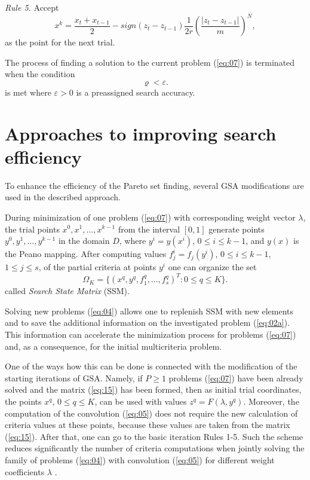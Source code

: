 \documentclass[runningheads]{llncs}
\begin{document}
\textit{Rule 5.} Accept
\begin{equation}
    \label{eq:13}
    x^{k} = \frac{x_t + x_{t-1}}{2} - sign(z_t - z_{t-1}) \frac{1}{2r} \left(\frac{|z_t - z_{t-1}|}{m} \right)^N,
\end{equation}
as the point for the next trial.

The process of finding a solution to the current problem (\ref{eq:07}) is terminated when the condition
\begin{equation}
    \label{eq:14}
    \varrho < \varepsilon.
\end{equation}
is met where $\varepsilon > 0$ is a preassigned search accuracy.



\section{Approaches to improving search efficiency}
\label{sec:4}

To enhance the efficiency of the Pareto set finding, several GSA modifications are used in the described approach.

During minimization of one problem (\ref{eq:07}) with corresponding weight vector $\lambda$, the trial points $x^0, x^1,\dots,x^{k-1}$ from the interval $[0,1]$ generate points $y^0, y^1,\dots,y^{k-1}$ in the domain $D$, where $y^i=y(x^i)$, $0 \leq i \leq k-1$, and $y(x)$ is the Peano mapping. After computing values $f^i_j=f_j(y^i)$, $0 \leq i \leq k-1$, $1 \leq j \leq s$, of the partial criteria at points $y^i$ one can organize the set 
\begin{equation}
    \label{eq:15}
    \Omega_K=\{(x^q,y^q,f^q_1,\dots,f^q_s)^T: 0 \leq q \leq K\}.
\end{equation}
called \textit{Search State Matrix} (SSM).

Solving new problems (\ref{eq:04}) allows one to replenish SSM with new elements and to save the additional information on the investigated problem (\ref{eq:02a}). This information can accelerate the minimization process for problems (\ref{eq:07}) and, as a consequence, for the initial multicriteria problem. 

One of the ways how this can be done is connected with the modification of the starting iterations of GSA. Namely, if $P \geq 1$ problems (\ref{eq:07}) have been already solved and the matrix (\ref{eq:15}) has been formed, then as initial trial coordinates, the points $x^q$, $0 \leq q \leq K$, can be used with values $z^q = F(\lambda,y^q)$. Moreover, the computation of the convolution (\ref{eq:05}) does not require the new calculation of criteria values at these points, because these values are taken from the matrix (\ref{eq:15}). After that, one can go to the basic iteration Rules 1-5. Such the scheme reduces significantly the number of criteria computations when jointly solving the family of problems (\ref{eq:04}) with convolution (\ref{eq:05}) for different weight coefficients $\lambda$ \cite{ML_MCO_2023,Gergel2018,GergelKozinov2020}.
\end{document}
